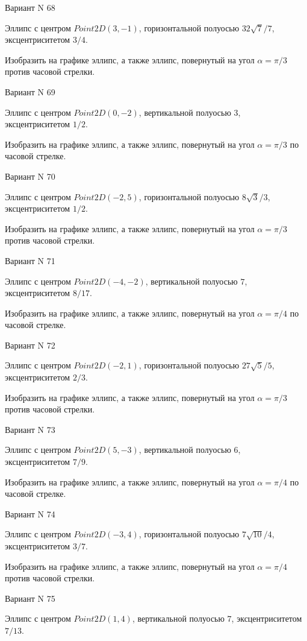 \documentclass[11pt]{report}
\begin{document}
Вариант N 68

Эллипс с центром $Point2D\left(3, -1\right)$, горизонтальной полуосью $32 \sqrt{7} / 7$, эксцентриситетом $3 / 4$.

    Изобразить на графике эллипс, а также эллипс, повернутый на угол $\alpha = $$\pi / 3$ против часовой стрелки.

Вариант N 69

Эллипс с центром $Point2D\left(0, -2\right)$, вертикальной полуосью $3$, эксцентриситетом $1 / 2$.

    Изобразить на графике эллипс, а также эллипс, повернутый на угол $\alpha = $$\pi / 3$ по часовой стрелке.

Вариант N 70

Эллипс с центром $Point2D\left(-2, 5\right)$, горизонтальной полуосью $8 \sqrt{3} / 3$, эксцентриситетом $1 / 2$.

    Изобразить на графике эллипс, а также эллипс, повернутый на угол $\alpha = $$\pi / 3$ против часовой стрелки.

Вариант N 71

Эллипс с центром $Point2D\left(-4, -2\right)$, вертикальной полуосью $7$, эксцентриситетом $8 / 17$.

    Изобразить на графике эллипс, а также эллипс, повернутый на угол $\alpha = $$\pi / 4$ по часовой стрелке.

Вариант N 72

Эллипс с центром $Point2D\left(-2, 1\right)$, горизонтальной полуосью $27 \sqrt{5} / 5$, эксцентриситетом $2 / 3$.

    Изобразить на графике эллипс, а также эллипс, повернутый на угол $\alpha = $$\pi / 3$ против часовой стрелки.

Вариант N 73

Эллипс с центром $Point2D\left(5, -3\right)$, вертикальной полуосью $6$, эксцентриситетом $7 / 9$.

    Изобразить на графике эллипс, а также эллипс, повернутый на угол $\alpha = $$\pi / 4$ по часовой стрелке.

Вариант N 74

Эллипс с центром $Point2D\left(-3, 4\right)$, горизонтальной полуосью $7 \sqrt{10} / 4$, эксцентриситетом $3 / 7$.

    Изобразить на графике эллипс, а также эллипс, повернутый на угол $\alpha = $$\pi / 4$ против часовой стрелки.

Вариант N 75

Эллипс с центром $Point2D\left(1, 4\right)$, вертикальной полуосью $7$, эксцентриситетом $7 / 13$.
\end{document}
